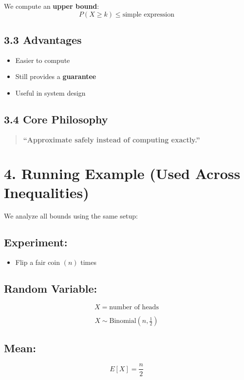 \documentclass[12pt]{article}
\begin{document}
We compute an \textbf{upper bound}:
\[
P(X \ge k) \le \text{simple expression}
\]

\subsection*{3.3 Advantages}

\begin{itemize}
\item Easier to compute
\item Still provides a \textbf{guarantee}
\item Useful in system design
\end{itemize}

\subsection*{3.4 Core Philosophy}

\begin{quote}
\textbf{``Approximate safely instead of computing exactly.''}
\end{quote}

\section*{4. Running Example (Used Across Inequalities)}

We analyze all bounds using the same setup:

\subsection*{Experiment:}

\begin{itemize}
\item Flip a fair coin $(n)$ times
\end{itemize}

\subsection*{Random Variable:}

\[
X = \text{number of heads}
\]

\[
X \sim \text{Binomial}(n, \tfrac{1}{2})
\]

\subsection*{Mean:}

\[
E[X] = \frac{n}{2}
\]
\end{document}
